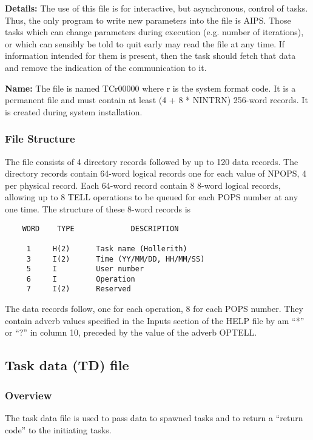{\bf Details:} The use of this file is for interactive, but asynchronous,
control of tasks.  Thus, the only program to write new parameters
into the file is AIPS.  Those tasks which can change parameters during
execution (e.g. number of iterations), or which can sensibly be told
to quit early may read the file at any time.  If information intended
for them is present, then the task should fetch that data and remove
the indication of the communication to it.

{\bf Name:} The file is named TCr00000 where r is the system format
code.   It is a permanent file and must
contain at least (4 + 8 * NINTRN) 256-word records.  It is
created during system installation.


\subsubsection{File Structure}

The file consists of 4 directory records followed by up to 120
data records.  The directory records contain 64-word logical
records one for each value of NPOPS, 4 per physical record.
Each 64-word record contain 8 8-word logical records, allowing
up to 8 TELL operations to be queued for each POPS number at any
one time.  The structure of these 8-word records is

\begin{verbatim}
    WORD    TYPE             DESCRIPTION

     1     H(2)      Task name (Hollerith)
     3     I(2)      Time (YY/MM/DD, HH/MM/SS)
     5     I         User number
     6     I         Operation
     7     I(2)      Reserved
\end{verbatim}

The data records follow, one for each operation, 8 for each POPS
number.  They contain adverb values specified in the Inputs section
of the HELP file by am ``*'' or ``?'' in column 10, preceded by the
value of the adverb OPTELL.

\subsection{Task data (TD) file}
\subsubsection{Overview}


  The task data file is used to pass data to spawned tasks and
to return a ``return code'' to the initiating tasks.

